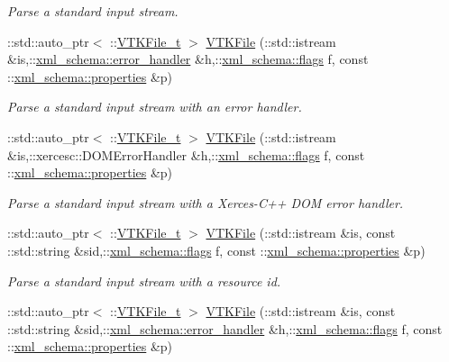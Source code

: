 \begin{DoxyCompactItemize}
\begin{DoxyCompactList}\small\item\em Parse a standard input stream. \end{DoxyCompactList}\item 
\-::std\-::auto\-\_\-ptr$<$ \-::\hyperlink{classVTKFile__t}{V\-T\-K\-File\-\_\-t} $>$ \hyperlink{vtk-unstructured_8cpp_ae23aec4e78c9498c7c876f961fa7cf89}{V\-T\-K\-File} (\-::std\-::istream \&is,\-::\hyperlink{namespacexml__schema_abdee01986b8e16f04af47dd12038261e}{xml\-\_\-schema\-::error\-\_\-handler} \&h,\-::\hyperlink{namespacexml__schema_a8d981c127a1f5106d04ad5853e707361}{xml\-\_\-schema\-::flags} f, const \-::\hyperlink{namespacexml__schema_aba199bc39c8b21c427369c27d2bcfc8c}{xml\-\_\-schema\-::properties} \&p)
\begin{DoxyCompactList}\small\item\em Parse a standard input stream with an error handler. \end{DoxyCompactList}\item 
\-::std\-::auto\-\_\-ptr$<$ \-::\hyperlink{classVTKFile__t}{V\-T\-K\-File\-\_\-t} $>$ \hyperlink{vtk-unstructured_8cpp_a973642863a68b619c0bca09536845eac}{V\-T\-K\-File} (\-::std\-::istream \&is,\-::xercesc\-::\-D\-O\-M\-Error\-Handler \&h,\-::\hyperlink{namespacexml__schema_a8d981c127a1f5106d04ad5853e707361}{xml\-\_\-schema\-::flags} f, const \-::\hyperlink{namespacexml__schema_aba199bc39c8b21c427369c27d2bcfc8c}{xml\-\_\-schema\-::properties} \&p)
\begin{DoxyCompactList}\small\item\em Parse a standard input stream with a Xerces-\/\-C++ D\-O\-M error handler. \end{DoxyCompactList}\item 
\-::std\-::auto\-\_\-ptr$<$ \-::\hyperlink{classVTKFile__t}{V\-T\-K\-File\-\_\-t} $>$ \hyperlink{vtk-unstructured_8cpp_a23832683b27b8e90f1ca393ddfe166f1}{V\-T\-K\-File} (\-::std\-::istream \&is, const \-::std\-::string \&sid,\-::\hyperlink{namespacexml__schema_a8d981c127a1f5106d04ad5853e707361}{xml\-\_\-schema\-::flags} f, const \-::\hyperlink{namespacexml__schema_aba199bc39c8b21c427369c27d2bcfc8c}{xml\-\_\-schema\-::properties} \&p)
\begin{DoxyCompactList}\small\item\em Parse a standard input stream with a resource id. \end{DoxyCompactList}\item 
\-::std\-::auto\-\_\-ptr$<$ \-::\hyperlink{classVTKFile__t}{V\-T\-K\-File\-\_\-t} $>$ \hyperlink{vtk-unstructured_8cpp_a9cf7007e58e8eefb16d14eab5ee97b36}{V\-T\-K\-File} (\-::std\-::istream \&is, const \-::std\-::string \&sid,\-::\hyperlink{namespacexml__schema_abdee01986b8e16f04af47dd12038261e}{xml\-\_\-schema\-::error\-\_\-handler} \&h,\-::\hyperlink{namespacexml__schema_a8d981c127a1f5106d04ad5853e707361}{xml\-\_\-schema\-::flags} f, const \-::\hyperlink{namespacexml__schema_aba199bc39c8b21c427369c27d2bcfc8c}{xml\-\_\-schema\-::properties} \&p)

\end{DoxyCompactItemize}
